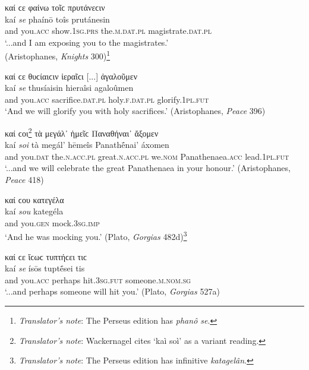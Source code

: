 \begin{exe}
\ex καί ϲε φαίνω τοῖϲ πρυτάνεϲιν\\
\gll kaí \emph{se} phaínō toîs prutánesin\\
and you.\textsc{acc} show.\textsc{1sg.prs} the.\textsc{m.dat.pl}
magistrate.\textsc{dat.pl}\\
\trans `...and I am exposing you to the magistrates.'\\
(Aristophanes, \textit{Knights} 300)\footnote{\emph{Translator's note}: The Perseus edition has \textit{phanô se}.}
\label{kaise9}
\end{exe}

\begin{exe}
\ex καί ϲε θυϲίαιϲιν ἱεραῖϲι {[}...{]} ἀγαλοῦμεν\\
\gll kaí \emph{se} thusíaisin hieraîsi agaloûmen\\
and you.\textsc{acc} sacrifice.\textsc{dat.pl} holy.\textsc{f.dat.pl} glorify.\textsc{1pl.fut}\\
\trans `And we will glorify you with holy sacrifices.' (Aristophanes, \textit{Peace} 396)
\label{kaise10}
\end{exe}

\begin{exe}
\ex καί ϲοι\footnote{\emph{Translator's note}: Wackernagel cites `kaì soì' as a variant
reading.} τὰ μεγάλ᾽ ἡμεῖϲ Παναθήναι᾽ ἄξομεν\\
\gll kaí \emph{soi} tà megál' hēmeîs Panathḗnai' áxomen\\
and you.\textsc{dat} the.\textsc{n.acc.pl} great.\textsc{n.acc.pl} we.\textsc{nom} Panathenaea.\textsc{acc} lead.\textsc{1pl.fut}\\
\trans `...and we will celebrate the great Panathenaea in your honour.' (Aristophanes, \textit{Peace} 418)
\label{kaisoi2}
\end{exe}

\begin{exe}
\ex καί ϲου κατεγέλα\\
\gll kaí \emph{sou} kategéla\\
and you.\textsc{gen} mock.\textsc{3sg.imp}\\
\trans `And he was mocking you.' (Plato, \textit{Gorgias} 482d)\footnote{\emph{Translator's note}: The Perseus edition has infinitive \textit{katagelân}.}
\label{kaisou1}
\end{exe}

\begin{exe}
\ex καί ϲε ἴϲωϲ τυπτήϲει τιϲ\\
\gll kaí \emph{se} ísōs tuptḗsei tis\\
and you.\textsc{acc} perhaps hit.\textsc{3sg.fut} someone.\textsc{m.nom.sg}\\
\trans `...and perhaps someone will hit you.' (Plato, \textit{Gorgias} 527a)
\label{kaise11}
\end{exe}

